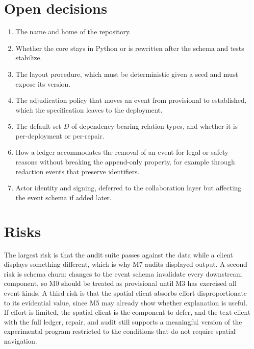\documentclass[11pt]{article}
\begin{document}
\section{Open decisions}

\begin{enumerate}[leftmargin=1.5em]
\item The name and home of the repository.
\item Whether the core stays in Python or is rewritten after the schema and tests stabilize.
\item The layout procedure, which must be deterministic given a seed and must expose its version.
\item The adjudication policy that moves an event from provisional to established, which the specification leaves to the deployment.
\item The default set $D$ of dependency-bearing relation types, and whether it is per-deployment or per-repair.
\item How a ledger accommodates the removal of an event for legal or safety reasons without breaking the append-only property, for example through redaction events that preserve identifiers.
\item Actor identity and signing, deferred to the collaboration layer but affecting the event schema if added later.
\end{enumerate}

\section{Risks}

The largest risk is that the audit suite passes against the data while a client displays something different, which is why M7 audits displayed output. A second risk is schema churn: changes to the event schema invalidate every downstream component, so M0 should be treated as provisional until M3 has exercised all event kinds. A third risk is that the spatial client absorbs effort disproportionate to its evidential value, since M5 may already show whether explanation is useful. If effort is limited, the spatial client is the component to defer, and the text client with the full ledger, repair, and audit still supports a meaningful version of the experimental program restricted to the conditions that do not require spatial navigation.
\end{document}
